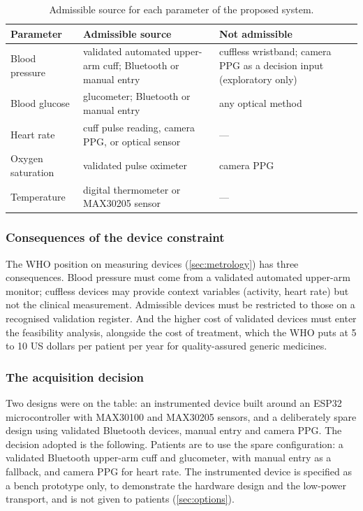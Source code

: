 \begin{table}[htbp]
\centering\small
\caption{Admissible source for each parameter of the proposed system.}\label{tab:param-sources}
\begin{tabularx}{\textwidth}{@{}>{\raggedright\arraybackslash}p{3.2cm} >{\raggedright\arraybackslash}X >{\raggedright\arraybackslash}p{4.6cm}@{}}
\toprule
\textbf{Parameter} & \textbf{Admissible source} & \textbf{Not admissible} \\
\midrule
Blood pressure & validated automated upper-arm cuff; Bluetooth or manual entry & cuffless wristband; camera PPG as a decision input (exploratory only) \\
Blood glucose & glucometer; Bluetooth or manual entry & any optical method \\
Heart rate & cuff pulse reading, camera PPG, or optical sensor & --- \\
Oxygen saturation & validated pulse oximeter & camera PPG \\
Temperature & digital thermometer or MAX30205 sensor & --- \\
\bottomrule
\end{tabularx}
\end{table}

\subsubsection{Consequences of the device constraint}\label{sec:metrology-consequences}

The WHO position on measuring devices (\cref{sec:metrology}) has three consequences. Blood pressure must come from a validated automated upper-arm monitor; cuffless devices may provide context variables (activity, heart rate) but not the clinical measurement. Admissible devices must be restricted to those on a recognised validation register. And the higher cost of validated devices must enter the feasibility analysis, alongside the cost of treatment, which the WHO puts at 5 to 10 US dollars per patient per year for quality-assured generic medicines.

\subsubsection{The acquisition decision}\label{sec:acq-decision}

Two designs were on the table: an instrumented device built around an ESP32 microcontroller with MAX30100 and MAX30205 sensors, and a deliberately spare design using validated Bluetooth devices, manual entry and camera PPG. The decision adopted is the following. Patients are to use the spare configuration: a validated Bluetooth upper-arm cuff and glucometer, with manual entry as a fallback, and camera PPG for heart rate. The instrumented device is specified as a bench prototype only, to demonstrate the hardware design and the low-power transport, and is not given to patients (\cref{sec:options}).

